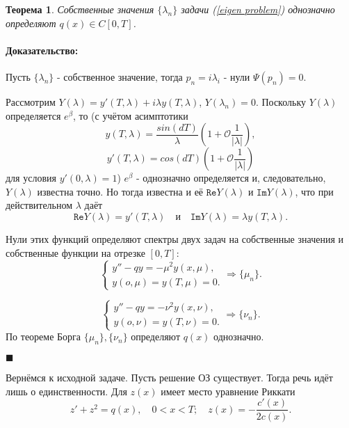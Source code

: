 \documentclass{article}
\newtheorem{theorem}{Теорема}
\newenvironment{proof}{\paragraph{Доказательство:}}{\hfill$\blacksquare$}
\begin{document}
\begin{theorem}
Собственные значения $\{\lambda_n\}$ задачи (\ref{eigen problem}) однозначно определяют $q(x) \in C[0,T]$.
\end{theorem}
\begin{proof}

Пусть $\{\lambda_n\}$ - собственное значение, тогда $p_n = i \lambda_i$ - нули $\Psi(p_n) = 0$.

Рассмотрим $Y(\lambda) = y'(T,\lambda) + i \lambda y (T,\lambda)$, $ Y(\lambda_n) = 0$. 
Поскольку $Y(\lambda)$ определяется $e^{\beta}$, то (с учётом асимптотики 
$$y(T,\lambda) = \dfrac{sin(dT)}{\lambda}(1+\mathcal{O}\dfrac{1}{|\lambda|}),$$
$$ y'(T,\lambda) = cos(dT)(1 + \mathcal{O}\dfrac{1}{|\lambda|})$$
для условия $y'(0,\lambda) = 1$) $e^{\beta}$ - однозначно определяется и, следовательно, $Y(\lambda)$ известна точно.
Но тогда известна и её $\texttt{Re}Y(\lambda)$ и $\texttt{Im}Y(\lambda)$, что при действительном $\lambda$ даёт
\begin{equation}
\texttt{Re}Y(\lambda) = y'(T,\lambda) \quad \texttt{и} \quad
\texttt{Im}Y(\lambda) = \lambda y(T,\lambda).
\end{equation}

Нули этих функций определяют спектры двух задач на собственные значения и собственные функции на отрезке $[0,T]$:
\begin{equation}
\begin{cases}
	y''- qy = -\mu^2 y(x,\mu),\\
	y(o,\mu) = y(T,\mu) = 0.
\end{cases}
\Rightarrow \{\mu_n\}.
\end{equation}

\begin{equation}
\begin{cases}
	y''- qy = -\nu^2 y(x,\nu),\\
	y(o,\nu) = y(T,\nu) = 0.
\end{cases}
\Rightarrow \{\nu_n\}.
\end{equation}
По теореме Борга $\{\mu_n\}, \{\nu_n\}$ определяют $q(x)$ однозначно.

\end{proof}


Вернёмся к исходной задаче. 
Пусть решение ОЗ существует. 
Тогда речь идёт лишь о единственности.
Для $z(x)$ имеет место уравнение Риккати 
\begin{equation*}
z' + z^2 = q(x), 
\quad 0<x<T; \quad
z(x) = -\dfrac{c'(x)}{2c(x)}.
\end{equation*}
\end{document}
